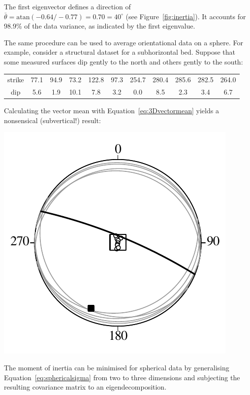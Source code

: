 The first eigenvector defines a direction of $\bar{\theta} =
\mbox{atan}(-0.64/-0.77) = 0.70 = 40^\circ$ (see
Figure~\ref{fig:inertia}). It accounts for 98.9\% of the data
variance, as indicated by the first eigenvalue.\medskip

The same procedure can be used to average orientational data on a
sphere. For example, consider a structural dataset for a subhorizontal
bed. Suppose that some measured surfaces dip gently to the north and
others gently to the south:

\begin{center}
  \begin{tabular}{c|cccccccccc}
    strike & 77.1 & 94.9 & 73.2 & 122.8 & 97.3 &
    254.7 & 280.4 & 285.6 & 282.5 & 264.0 \\
    dip & 5.6 & 1.9 & 10.1 & 7.8 & 3.2 & 0.0 & 8.5 & 2.3 & 3.4 & 6.7
\end{tabular}
\end{center}

Calculating the vector mean with Equation~\ref{eq:3Dvectormean} yields
a nonsensical (subvertical!) result:\medskip

\noindent\begin{minipage}[t][][b]{.35\textwidth}
\includegraphics[]{../figures/subhorizontal.pdf}
\end{minipage}
\begin{minipage}[t][][t]{.65\textwidth}
  \label{fig:subhorizontal}
\end{minipage}

The moment of inertia can be minimised for spherical data by
generalising Equation~\ref{eq:sphericalsigma} from two to three
dimensions and subjecting the resulting covariance matrix to an
eigendecomposition.
